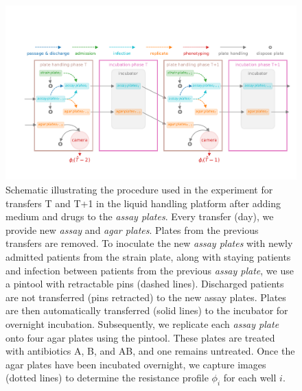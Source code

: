 \begin{figure}[p]
    \centering
    \includegraphics[width = \linewidth]{supplementary_1/figures/setup.pdf}
    \caption{
            Schematic illustrating the procedure used in the experiment for transfers T and T+1  in the liquid handling platform after adding medium and drugs to the \textit{assay plates}. 
            Every transfer (day), we provide new  \textit{assay} and \textit{agar plates}. 
            Plates from the previous transfers are removed.
            To inoculate the new \textit{assay plates} with newly admitted patients from the strain plate, along with staying patients and infection between patients from the previous \textit{assay plate}, we use a pintool with retractable pins (dashed lines). 
            Discharged patients are not transferred (pins retracted) to the new assay plates. 
            Plates are then automatically transferred (solid lines) to the incubator for overnight incubation. Subsequently, we replicate each \textit{assay plate} onto four agar plates using the pintool. These plates are treated with antibiotics A, B, and AB, and one remains untreated. Once the agar plates have been incubated overnight, we capture images (dotted lines) to determine the resistance profile $\phi_i$ for each well $i$.}
    \label{fig:procedure}
\end{figure}


